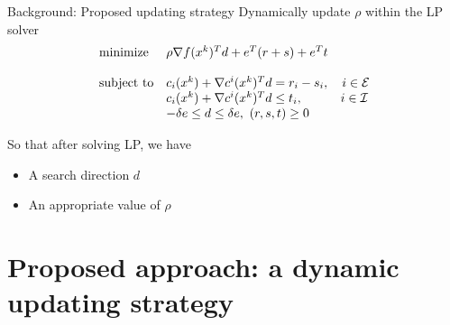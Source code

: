 \documentclass[8pt]{beamer}
\begin{document}
\begin{frame}{Background: Proposed updating strategy} 
Dynamically update $\rho$ {\color{red} within} the LP solver
\[
\begin{array}{ll}
 \mbox{minimize}&  \rho \nabla f(x^k)^Td +e^T(r+s) +  e^Tt \\ \\
 \mbox{subject to}&  c_i(x^k) + \nabla c^i(x^k)^T d =  r_i - s_i ,  \quad i\in{\cal E}\\
          & c_i(x^k) + \nabla c^i(x^k)^T d \le t_i, \quad \qquad i\in {\cal I}\\
          & -\delta e \le  d \le \delta e, \   (r,s,t) \ge 0
\end{array}
\]

\vfill

So that after solving LP, we have

\smallskip

\begin{itemize}
\item {\color{red} A search direction $d$}
\item {\color{red} An appropriate value of $\rho$}
\end{itemize}

\end{frame}














\section{Proposed approach: a dynamic updating strategy}
\end{document}
